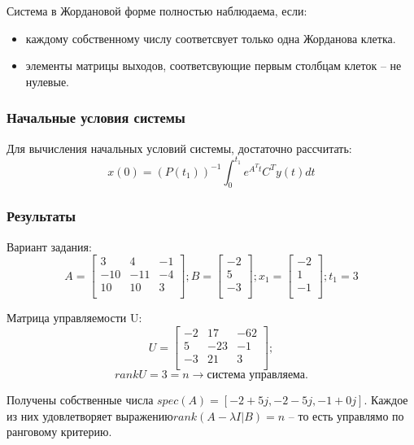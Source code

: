 Система в Жордановой форме полностью наблюдаема, если:
\begin{itemize}
    \item каждому собственному числу соответсвует только одна Жорданова клетка. 
    \item элементы матрицы выходов, соответсвующие первым столбцам клеток -- не нулевые.
\end{itemize}

\subsubsection{Начальные условия системы}
Для вычисления начальных условий системы, достаточно рассчитать:
\[x(0) = (P(t_1))^{-1} \int_{0}^{t_1} e^{A^T t} C^T y(t) dt\]


\subsubsection{Результаты}
Вариант задания:
\[ A = \begin{bmatrix}
        3 & 4 & -1 \\
        -10 & -11 & -4 \\
        10 & 10 & 3 \\
        \end{bmatrix}; 
        B = \begin{bmatrix}
                -2 \\
                5 \\
                -3 \\
                \end{bmatrix}; 
        x_1 = \begin{bmatrix}
                -2 \\
                1 \\
                -1 \\
                \end{bmatrix}; 
        t_1 = 3
\]

Матрица управляемости U:
\[ U = \begin{bmatrix}
        -2 & 17 & -62 \\
        5 & -23 & -1 \\
        -3 & 21 & 3 \\
        \end{bmatrix};
\]
\[rankU = 3 = n \rightarrow \text{система управляема.}\]

Получены собственные числа \(spec(A) = [-2+5j, -2 -5j, -1+0j]\). Каждое из них удовлетворяет выражению\(rank(A - \lambda I | B) = n \) -- то есть управлямо по ранговому критерию.

